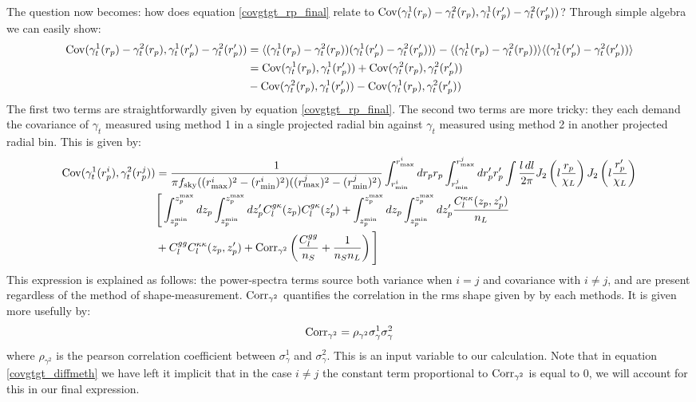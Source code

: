 \documentclass[onecolumn,amsmath,aps,fleqn, superscriptaddress]{revtex4}
\begin{document}
The question now becomes: how does equation \ref{covgtgt_rp_final} relate to ${\rm Cov}(\gamma_t^1(r_p) - \gamma_t^2(r_p), \gamma_t^1(r_p^\prime) - \gamma_t^2(r_p^\prime))$? Through simple algebra we can easily show:
\begin{align}
{\rm Cov}(\gamma_t^1(r_p) - \gamma_t^2(r_p), \gamma_t^1(r_p^\prime) - \gamma_t^2(r_p^\prime)) & = \langle (\gamma_t^1(r_p) - \gamma_t^2(r_p))(\gamma_t^1(r_p^\prime) - \gamma_t^2(r_p^\prime))\rangle - \langle (\gamma_t^1(r_p) - \gamma_t^2(r_p)) \rangle \langle(\gamma_t^1(r_p^\prime) - \gamma_t^2(r_p^\prime))\rangle \nonumber \\ &= {\rm Cov}(\gamma_t^1(r_p), \gamma_t^1(r_p^\prime)) + {\rm Cov}(\gamma_t^2(r_p), \gamma_t^2(r_p^\prime)) \nonumber \\ &- {\rm Cov}(\gamma_t^2(r_p), \gamma_t^1(r_p^\prime)) - {\rm Cov}(\gamma_t^1(r_p), \gamma_t^2(r_p^\prime))
\label{covexpandgam}
\end{align}
The first two terms are straightforwardly given by equation \ref{covgtgt_rp_final}. The second two terms are more tricky: they each demand the covariance of $\gamma_t$ measured using method 1 in a single projected radial bin against $\gamma_t$ measured using method 2 in another projected radial bin. This is given by:
\begin{align}
{\rm Cov}(\gamma_t^1(r_p^i), \gamma_t^2(r_p^j)) &= \frac{1}{\pi f_{\rm sky}((r^i_{\rm max})^2 - (r^i_{\rm min})^2)((r^j_{\rm max})^2 - (r^j_{\rm min})^2)}  \int_{r^i_{\rm min}}^{r^i_{\rm max}} dr_p r_p \int_{r^j_{\rm min}}^{r^j_{\rm max}} dr_p^\prime r_p^\prime \int \frac{l \, dl}{2\pi} J_2\left(l \frac{r_p}{\chi_L}\right) J_2 \left(l \frac{r_p^\prime}{\chi_L}\right) \nonumber \\ &\Bigg[ \int_{z_p^{\rm min}}^{z_p^{\rm max}} d z_p  \int_{z_p^{\rm min}}^{z_p^{\rm max}} dz_p^\prime C_l^{g \kappa}(z_p)C_l^{g \kappa}(z_p^\prime) + \int_{z_p^{\rm min}}^{z_p^{\rm max}} d z_p  \int_{z_p^{\rm min}}^{z_p^{\rm max}} dz_p^\prime\frac{C_l^{\kappa \kappa}(z_p, z_p^\prime)}{n_L} \nonumber \\ &+ C_l^{gg} C_l^{\kappa \kappa}(z_p, z_p^\prime)  + {\rm Corr}_{\gamma^2}\left(\frac{C_l^{gg}}{n_S} + \frac{1}{n_S n_L} \right)  \Bigg]
\label{covgtgt_diffmeth}
\end{align}
This expression is explained as follows: the power-spectra terms source both variance when $i=j$ and covariance with $i \ne j$, and are present regardless of the method of shape-measurement. ${\rm Corr}_{\gamma^2}$ quantifies the correlation in the rms shape given by by each methods. It is given more usefully by:
\begin{equation}
{\rm Corr}_{\gamma^2} = \rho_{\gamma^2} \sigma_{\gamma}^{1}\sigma_{\gamma}^{2}
\label{corr_gam}
\end{equation}
where $\rho_{\gamma^2}$ is the pearson correlation coefficient between $\sigma_{\gamma}^{1} $ and $\sigma_{\gamma}^{2}$. This is an input variable to our calculation. Note that in equation \ref{covgtgt_diffmeth} we have left it implicit that in the case $i \ne j$ the constant term proportional to ${\rm Corr}_{\gamma^2}$ is equal to 0, we will account for this in our final expression.
\end{document}
